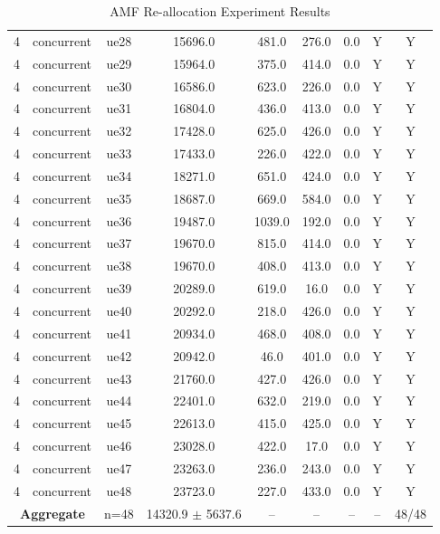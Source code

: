 \begin{table}[ht]
\begin{tabular}{|c|c|c|c|c|c|c|c|c|}
4 & concurrent & ue28 & 15696.0 & 481.0 & 276.0 & 0.0 & Y & Y \\
4 & concurrent & ue29 & 15964.0 & 375.0 & 414.0 & 0.0 & Y & Y \\
4 & concurrent & ue30 & 16586.0 & 623.0 & 226.0 & 0.0 & Y & Y \\
4 & concurrent & ue31 & 16804.0 & 436.0 & 413.0 & 0.0 & Y & Y \\
4 & concurrent & ue32 & 17428.0 & 625.0 & 426.0 & 0.0 & Y & Y \\
4 & concurrent & ue33 & 17433.0 & 226.0 & 422.0 & 0.0 & Y & Y \\
4 & concurrent & ue34 & 18271.0 & 651.0 & 424.0 & 0.0 & Y & Y \\
4 & concurrent & ue35 & 18687.0 & 669.0 & 584.0 & 0.0 & Y & Y \\
4 & concurrent & ue36 & 19487.0 & 1039.0 & 192.0 & 0.0 & Y & Y \\
4 & concurrent & ue37 & 19670.0 & 815.0 & 414.0 & 0.0 & Y & Y \\
4 & concurrent & ue38 & 19670.0 & 408.0 & 413.0 & 0.0 & Y & Y \\
4 & concurrent & ue39 & 20289.0 & 619.0 & 16.0 & 0.0 & Y & Y \\
4 & concurrent & ue40 & 20292.0 & 218.0 & 426.0 & 0.0 & Y & Y \\
4 & concurrent & ue41 & 20934.0 & 468.0 & 408.0 & 0.0 & Y & Y \\
4 & concurrent & ue42 & 20942.0 & 46.0 & 401.0 & 0.0 & Y & Y \\
4 & concurrent & ue43 & 21760.0 & 427.0 & 426.0 & 0.0 & Y & Y \\
4 & concurrent & ue44 & 22401.0 & 632.0 & 219.0 & 0.0 & Y & Y \\
4 & concurrent & ue45 & 22613.0 & 415.0 & 425.0 & 0.0 & Y & Y \\
4 & concurrent & ue46 & 23028.0 & 422.0 & 17.0 & 0.0 & Y & Y \\
4 & concurrent & ue47 & 23263.0 & 236.0 & 243.0 & 0.0 & Y & Y \\
4 & concurrent & ue48 & 23723.0 & 227.0 & 433.0 & 0.0 & Y & Y \\
\multicolumn{2}{|c|}{\textbf{Aggregate}} & n=48 & 14320.9 $\pm$ 5637.6 & -- & -- & -- & -- & 48/48 \\
\hline
\end{tabular}
\caption{AMF Re-allocation Experiment Results}
\label{tab:amf_realloc}
\end{table}

